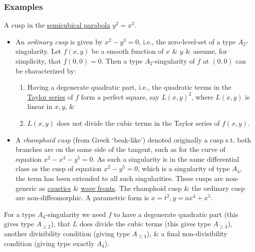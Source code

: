 \documentclass{article}
\begin{document}
\subsubsection{Examples}
{\sf A cusp in the \href{https://en.wikipedia.org/wiki/Semicubical_parabola}{semicubical parabola} $y^2 = x^3$.}
\begin{itemize}
	\item An {\it ordinary cusp} is given by $x^2 - y^3 = 0$, i.e., the zero-level-set of a type $A_2$-singularity. Let $f(x,y)$ be a smooth function of $x$ \& $y$ \& assume, for simplicity, that $f(0,0) = 0$. Then a type $A_2$-singularity of $f$ at $(0,0)$ can be characterized by:
	\begin{enumerate}
		\item Having a degenerate quadratic part, i.e., the quadratic terms in the \href{https://en.wikipedia.org/wiki/Taylor_series}{Taylor series} of $f$ form a perfect square, say $L(x,y)^2$, where $L(x,y)$ is linear in $x,y$, \&
		\item $L(x,y)$ does not divide the cubic terms in the Taylor series of $f(x,y)$.
	\end{enumerate}
	\item A {\it rhamphoid cusp} (from Greek `beak-like') denoted originally a cusp s.t. both branches are on the same side of the tangent, such as for the curve of equation $x^2 - x^4 - y^5 = 0$. As such a singularity is in the same differential class as the cusp of equation $x^2 - y^5 = 0$, which is a singularity of type $A_4$, the term has been extended to all such singularities. These cusps are non-generic as \href{https://en.wikipedia.org/wiki/Caustic_(mathematics)}{caustics} \& \href{https://en.wikipedia.org/wiki/Wave_front}{wave fronts}. The rhamphoid cusp \& the ordinary cusp are non-diffeomorphic. A parametric form is $x = t^2,y = ax^4 + x^5$.
\end{itemize}
For a type $A_4$-singularity we need $f$ to have a degenerate quadratic part (this gives type $A_{\ge2}$), that $L$ does divide the cubic terms (this gives type $A_{\ge3}$), another divisibility condition (giving type $A_{\ge4}$), \& a final non-divisibility condition (giving type exactly $A_4$).
\end{document}
